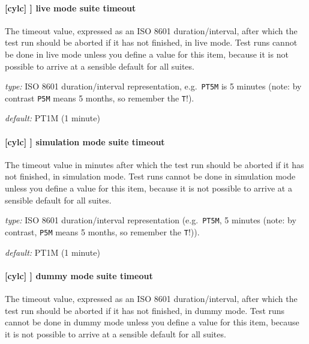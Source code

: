 \paragraph[live mode suite timeout]{[cylc] \textrightarrow [[reference test]] \textrightarrow live mode suite timeout}

The timeout value, expressed as an ISO 8601 duration/interval, after which the
test run should be aborted if it has not finished, in live mode. Test runs
cannot be done in live mode unless you define a value for this item, because
it is not possible to arrive at a sensible default for all suites.

\begin{myitemize}
    \item {\em type:} ISO 8601 duration/interval representation, e.g.\ 
        \lstinline=PT5M= is 5 minutes (note: by contrast \lstinline=P5M= means 5
         months, so remember the \lstinline=T=!).
    \item {\em default:} PT1M (1 minute)
\end{myitemize}

\paragraph[simulation mode suite timeout]{[cylc] \textrightarrow [[reference test]] \textrightarrow simulation mode suite timeout}

The timeout value in minutes after which the test run should be aborted
if it has not finished, in simulation mode. Test runs cannot be done in
simulation mode unless you define a value for this item, because it is
not possible to arrive at a sensible default for all suites.

\begin{myitemize}
    \item {\em type:} ISO 8601 duration/interval representation (e.g.\ 
 \lstinline=PT5M=, 5 minutes (note: by contrast, \lstinline=P5M= means 5
 months, so remember the \lstinline=T=!)).
    \item {\em default:} PT1M (1 minute)
\end{myitemize}

\paragraph[dummy mode suite timeout]{[cylc] \textrightarrow [[reference test]] \textrightarrow dummy mode suite timeout}

The timeout value, expressed as an ISO 8601 duration/interval, after which the
test run should be aborted if it has not finished, in dummy mode.  Test runs
cannot be done in dummy mode unless you define a value for this item, because
it is not possible to arrive at a sensible default for all suites.

